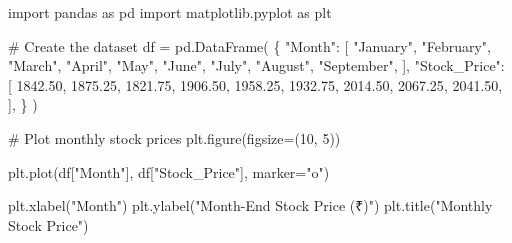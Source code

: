 \documentclass[
  a4paper,
]{article}
\newenvironment{Shaded}{\begin{snugshade}}{\end{snugshade}}
\newcommand{\CommentTok}[1]{\textcolor[rgb]{0.37,0.37,0.37}{#1}}
\newcommand{\DecValTok}[1]{\textcolor[rgb]{0.68,0.00,0.00}{#1}}
\newcommand{\FloatTok}[1]{\textcolor[rgb]{0.68,0.00,0.00}{#1}}
\newcommand{\ImportTok}[1]{\textcolor[rgb]{0.00,0.46,0.62}{#1}}
\newcommand{\NormalTok}[1]{\textcolor[rgb]{0.00,0.23,0.31}{#1}}
\newcommand{\OperatorTok}[1]{\textcolor[rgb]{0.37,0.37,0.37}{#1}}
\newcommand{\StringTok}[1]{\textcolor[rgb]{0.13,0.47,0.30}{#1}}
\begin{document}
\begin{tcolorbox}[enhanced jigsaw, arc=.35mm, bottomrule=.15mm, bottomtitle=1mm, breakable, colback=white, colbacktitle=quarto-callout-tip-color!10!white, colframe=quarto-callout-tip-color-frame, coltitle=black, left=2mm, leftrule=.75mm, opacityback=0, opacitybacktitle=0.6, rightrule=.15mm, title=\textcolor{quarto-callout-tip-color}{\faLightbulb}\hspace{0.5em}{💻 Coding Session}, titlerule=0mm, toprule=.15mm, toptitle=1mm]

\begin{Shaded}
\begin{Highlighting}[]
\ImportTok{import}\NormalTok{ pandas }\ImportTok{as}\NormalTok{ pd}
\ImportTok{import}\NormalTok{ matplotlib.pyplot }\ImportTok{as}\NormalTok{ plt}

\CommentTok{\# Create the dataset}
\NormalTok{df }\OperatorTok{=}\NormalTok{ pd.DataFrame(}
\NormalTok{    \{}
        \StringTok{"Month"}\NormalTok{: [}
            \StringTok{"January"}\NormalTok{,}
            \StringTok{"February"}\NormalTok{,}
            \StringTok{"March"}\NormalTok{,}
            \StringTok{"April"}\NormalTok{,}
            \StringTok{"May"}\NormalTok{,}
            \StringTok{"June"}\NormalTok{,}
            \StringTok{"July"}\NormalTok{,}
            \StringTok{"August"}\NormalTok{,}
            \StringTok{"September"}\NormalTok{,}
\NormalTok{        ],}
        \StringTok{"Stock\_Price"}\NormalTok{: [}
            \FloatTok{1842.50}\NormalTok{,}
            \FloatTok{1875.25}\NormalTok{,}
            \FloatTok{1821.75}\NormalTok{,}
            \FloatTok{1906.50}\NormalTok{,}
            \FloatTok{1958.25}\NormalTok{,}
            \FloatTok{1932.75}\NormalTok{,}
            \FloatTok{2014.50}\NormalTok{,}
            \FloatTok{2067.25}\NormalTok{,}
            \FloatTok{2041.50}\NormalTok{,}
\NormalTok{        ],}
\NormalTok{    \}}
\NormalTok{)}

\CommentTok{\# Plot monthly stock prices}
\NormalTok{plt.figure(figsize}\OperatorTok{=}\NormalTok{(}\DecValTok{10}\NormalTok{, }\DecValTok{5}\NormalTok{))}

\NormalTok{plt.plot(df[}\StringTok{"Month"}\NormalTok{], df[}\StringTok{"Stock\_Price"}\NormalTok{], marker}\OperatorTok{=}\StringTok{"o"}\NormalTok{)}

\NormalTok{plt.xlabel(}\StringTok{"Month"}\NormalTok{)}
\NormalTok{plt.ylabel(}\StringTok{"Month{-}End Stock Price (₹)"}\NormalTok{)}
\NormalTok{plt.title(}\StringTok{"Monthly Stock Price"}\NormalTok{)}


\end{Highlighting}
\end{Shaded}
\end{tcolorbox}
\end{document}
